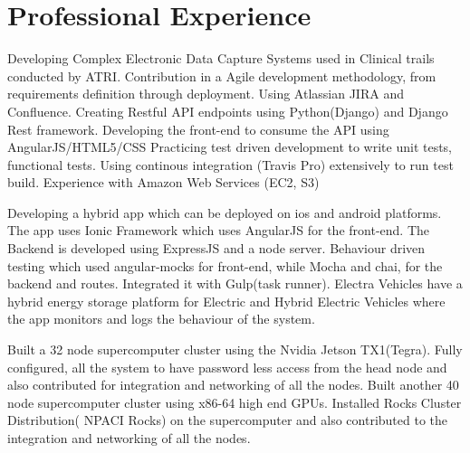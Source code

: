 \documentclass{Mihir_Kavatkar-Resume}
\begin{document}
	\section{Professional Experience}
		\vspace*{-0.5em}
		\currentwork
		{Developing Complex Electronic Data Capture Systems used in Clinical trails conducted by ATRI.}
		{Contribution in a Agile development methodology, from requirements definition through deployment. Using Atlassian JIRA and Confluence.}
		{Creating Restful API endpoints using Python(Django) and Django Rest framework.}
		{Developing the front-end to consume the API using AngularJS/HTML5/CSS}
		{Practicing test driven development to write unit tests, functional tests. Using continous integration (Travis Pro) extensively to run test build.}
		{Experience with Amazon Web Services (EC2, S3)}
		
		\vspace*{-0.5em}
		\fourbullets
		{Developing a hybrid app which can be deployed on ios and android platforms.} {The app uses Ionic Framework which uses AngularJS for the front-end. The Backend is developed using ExpressJS and a node server.} 
		{Behaviour driven testing which used angular-mocks for front-end, while Mocha and chai, for the backend and routes. Integrated it with Gulp(task runner).}
		{Electra Vehicles have a hybrid energy storage platform for Electric and Hybrid Electric Vehicles where the app monitors and logs the behaviour of the system.}
		
		\vspace*{-0.5em}
		\fourbullets
		{Built a 32 node supercomputer cluster using the Nvidia Jetson TX1(Tegra).}
		{ Fully configured, all the system to have password less access from the head node and also contributed for integration and networking of all the nodes.}
		{Built another 40 node supercomputer cluster using x86-64 high end GPUs.}{ Installed Rocks Cluster Distribution( NPACI Rocks) on the supercomputer and also contributed to the integration and networking of all the nodes.}
		
\end{document}
